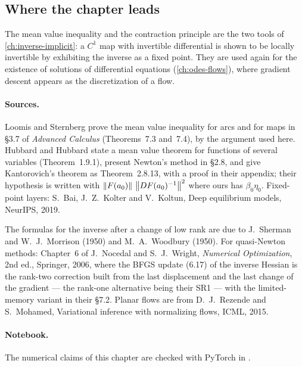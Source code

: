 \begin{notechapter}
\section{Where the chapter leads}\label{contractions-newton:sec:outlook}

The mean value inequality and the contraction principle are the two tools
of \cref{ch:inverse-implicit}: a $C^1$ map with invertible differential is
shown to be locally invertible by exhibiting the inverse as a fixed point.
They are used again for the existence of solutions of differential
equations (\cref{ch:odes-flows}), where gradient descent appears as the
discretization of a flow.

\paragraph{Sources.} Loomis and Sternberg prove the mean value inequality
for arcs and for maps in \S3.7 of \emph{Advanced Calculus} (Theorems~7.3
and~7.4), by the argument used here. Hubbard and Hubbard state a mean
value theorem for functions of several variables (Theorem~1.9.1), present
Newton's method in \S2.8, and give Kantorovich's theorem as
Theorem~2.8.13, with a proof in their appendix; their hypothesis is
written with $\left\|F(a_0)\right\|\,\left\|DF(a_0)^{-1}\right\|^2$ where ours has
$\beta_0\eta_0$. Fixed-point layers: S.~Bai, J.~Z.~Kolter and V.~Koltun,
Deep equilibrium models, NeurIPS, 2019.

The formulas for the inverse after a change of low rank are due to
J.~Sherman and W.~J.~Morrison (1950) and M.~A.~Woodbury (1950). For
quasi-Newton methods: Chapter~6 of J.~Nocedal and S.~J.~Wright,
\emph{Numerical Optimization}, 2nd ed., Springer, 2006, where the BFGS
update (6.17) of the inverse Hessian is the rank-two correction built
from the last displacement and the last change of the gradient --- the
rank-one alternative being their SR1 --- with the limited-memory
variant in their \S7.2. Planar
flows are from D.~J.~Rezende and S.~Mohamed, Variational inference with
normalizing flows, ICML, 2015.

\paragraph{Notebook.} The numerical claims of this chapter are checked
with PyTorch in .


\end{notechapter}
